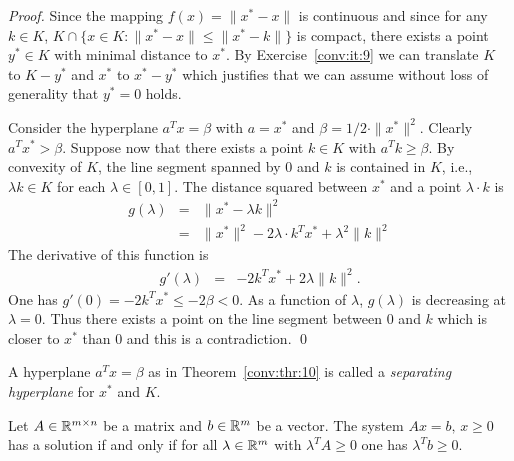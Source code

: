 \begin{proof}
  Since the mapping $f(x) = \|x^*-x\|$ is continuous and since for any
  $k \in K$, $K \cap \{ x \in K \colon \|x^* - x\|\leq \|x^* - k\|\}$ is
  compact, there exists a point $y^* \in K$ with minimal distance to
  $x^*$. By Exercise~\ref{conv:it:9} we can translate $K$ to $K-y^*$ and $x^*$ to $x^* - y^*$ which justifies that we can assume without loss of generality that $y^*=0$ holds. 


  Consider the hyperplane $a^Tx = \beta$ with $a = x^*$ and $\beta = 1/2 ⋅ \|x^*\|^2$.%
  Clearly $a^T x^* > β$. Suppose now that there exists a point $k ∈ K$ with $a^T k ≥ β$. By convexity of $K$,  the line segment spanned by $0$ and $k$ is contained in $K$, i.e.,   $λ k ∈ K $ for each $λ ∈ [0,1]$. The distance squared between $x^*$ and a point $λ ⋅ k$ is 
  \begin{eqnarray*}
    g(λ) & = &  \| x^* - λ k \|^2  \\
         & = &  \| x^*\|^2 - 2λ ⋅ k^T {x^*}  +   λ^2\| k \|^2
  \end{eqnarray*}
The derivative of this function is 
   \begin{eqnarray*}
    g'(λ)         & = &  - 2  k^T x^* +  2 λ \| k \|^2. 
   \end{eqnarray*}
   One has $g'(0) = - 2 k^T {x^*}  ≤ -2 β <0$. 
  As a function of $\lambda$, $g(λ)$ is decreasing 
  at $\lambda=0$. Thus there exists a point on the line segment between $0$ and $k$ which is closer to $x^*$ than $0$ and this is a contradiction. 
  \qed 
\end{proof}



\begin{definition}
  \label{def:4}
  A hyperplane $a^T x = β$ as in Theorem~\ref{conv:thr:10} is called a \emph{separating hyperplane} for $x^*$ and $K$. 
\end{definition}


\begin{theorem}
  \label{conv:thr:12}
  Let $A \in \mathbb{R}^{m\times n}$ be a matrix and $b \in \mathbb{R}^m$ be a vector. The
  system $Ax = b, \,x\geq0$ has a solution if and only if for all $\lambda \in
  \mathbb{R}^m$ with $\lambda^TA\geq0$ one has $\lambda^Tb \geq0$.  
\end{theorem}

